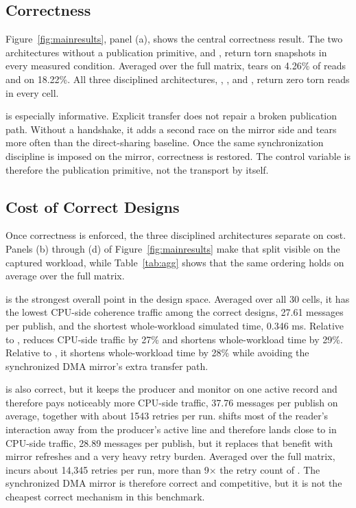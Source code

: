 \subsection{Correctness}

Figure~\ref{fig:mainresults}, panel (a), shows the central correctness
result. The two architectures without a publication primitive, \unsync
and \dmanaive, return torn snapshots in every measured condition.
Averaged over the full matrix, \unsync tears on 4.26\% of reads and
\dmanaive on 18.22\%. All three disciplined architectures, \seqlock,
\dblbuf, and \dmaseqlock, return zero torn reads in every cell.

\dmanaive is especially informative. Explicit transfer does not repair a
broken publication path. Without a handshake, it adds a second race on
the mirror side and tears more often than the direct-sharing baseline.
Once the same synchronization discipline is imposed on the mirror,
correctness is restored. The control variable is therefore the
publication primitive, not the transport by itself.

\subsection{Cost of Correct Designs}

Once correctness is enforced, the three disciplined architectures
separate on cost. Panels (b) through (d) of
Figure~\ref{fig:mainresults} make that split visible on the captured
workload, while Table~\ref{tab:agg} shows that the same ordering holds
on average over the full matrix.

\dblbuf is the strongest overall point in the design space. Averaged
over all 30 cells, it has the lowest CPU-side coherence traffic among
the correct designs, 27.61 messages per publish, and the shortest
whole-workload simulated time, 0.346 ms. Relative to \seqlock,
\dblbuf reduces CPU-side traffic by 27\% and shortens whole-workload
time by 29\%. Relative to \dmaseqlock, it shortens whole-workload time
by 28\% while avoiding the synchronized DMA mirror's extra transfer
path.

\seqlock is also correct, but it keeps the producer and monitor on one
active record and therefore pays noticeably more CPU-side traffic,
37.76 messages per publish on average, together with about 1543 retries
per run. \dmaseqlock shifts most of the reader's interaction away from
the producer's active line and therefore lands close to \dblbuf in
CPU-side traffic, 28.89 messages per publish, but it replaces that
benefit with mirror refreshes and a very heavy retry burden. Averaged
over the full matrix, \dmaseqlock incurs about 14{,}345 retries per run,
more than 9$\times$ the retry count of \seqlock. The synchronized DMA
mirror is therefore correct and competitive, but it is not the cheapest
correct mechanism in this benchmark.

